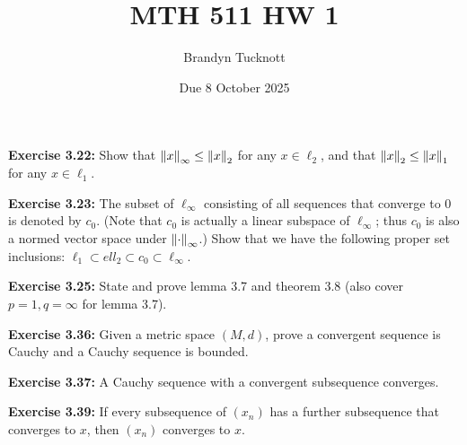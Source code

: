 \documentclass{exam}
\title{MTH 511 HW 1}
\author{Brandyn Tucknott}
\date{Due 8 October 2025}
\begin{document}
\maketitle

\begin{questions}
    \question \textbf{Exercise 3.22:} Show that $\left\| x \right\|_\infty\leq\left\| x \right\|_2$ for any $x\in\ell_2$, and that $\left\| x \right\|_2 \leq \left\| x \right\|_1$ for any $x\in\ell_1$.


    \question \textbf{Exercise 3.23:} The subset of $\ell_\infty$ consisting of all sequences that converge to 0 is denoted by $c_0$. (Note that $c_0$ is
    actually a linear subspace of $\ell_\infty$; thus $c_0$ is also a normed vector space under $\left\| \cdot \right\|_\infty$.) Show that
    we have the following proper set inclusions: $\ell_1 \subset ell_2 \subset c_0 \subset \ell_\infty$.


    \question \textbf{Exercise 3.25:} State and prove lemma 3.7 and theorem 3.8 (also cover $p = 1, q = \infty$ for lemma 3.7).


    \question \textbf{Exercise 3.36:} Given a metric space $(M, d)$, prove a convergent sequence is Cauchy and a Cauchy sequence is bounded.


    \question \textbf{Exercise 3.37:} A Cauchy sequence with a convergent subsequence converges.


    \question \textbf{Exercise 3.39:} If every subsequence of $(x_n)$ has a further subsequence that converges to $x$, then $(x_n)$ converges to $x$.


\end{questions}
\end{document}
